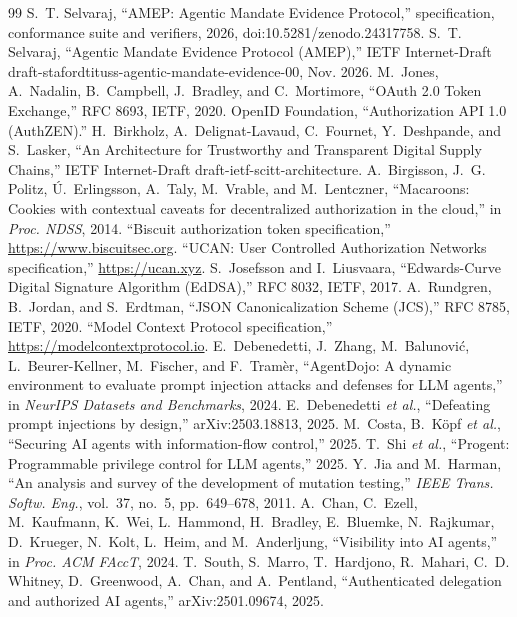 \documentclass[conference]{IEEEtran}
\begin{document}
\begin{thebibliography}{99}\small
{} S.~T. Selvaraj, ``AMEP: Agentic Mandate Evidence Protocol,'' specification, conformance suite and verifiers, 2026, doi:10.5281/zenodo.24317758.
 S.~T. Selvaraj, ``Agentic Mandate Evidence Protocol (AMEP),'' IETF Internet-Draft draft-stafordtituss-agentic-mandate-evidence-00, Nov. 2026.
 M.~Jones, A.~Nadalin, B.~Campbell, J.~Bradley, and C.~Mortimore, ``OAuth 2.0 Token Exchange,'' RFC 8693, IETF, 2020.
 OpenID Foundation, ``Authorization API 1.0 (AuthZEN).''
 H.~Birkholz, A.~Delignat-Lavaud, C.~Fournet, Y.~Deshpande, and S.~Lasker, ``An Architecture for Trustworthy and Transparent Digital Supply Chains,'' IETF Internet-Draft draft-ietf-scitt-architecture.
 A.~Birgisson, J.~G. Politz, {\'U}.~Erlingsson, A.~Taly, M.~Vrable, and M.~Lentczner, ``Macaroons: Cookies with contextual caveats for decentralized authorization in the cloud,'' in \emph{Proc. NDSS}, 2014.
 ``Biscuit authorization token specification,'' \url{https://www.biscuitsec.org}.
 ``UCAN: User Controlled Authorization Networks specification,'' \url{https://ucan.xyz}.
 S.~Josefsson and I.~Liusvaara, ``Edwards-Curve Digital Signature Algorithm (EdDSA),'' RFC 8032, IETF, 2017.
 A.~Rundgren, B.~Jordan, and S.~Erdtman, ``JSON Canonicalization Scheme (JCS),'' RFC 8785, IETF, 2020.
 ``Model Context Protocol specification,'' \url{https://modelcontextprotocol.io}.
 E.~Debenedetti, J.~Zhang, M.~Balunovi{\'c}, L.~Beurer-Kellner, M.~Fischer, and F.~Tram{\`e}r, ``AgentDojo: A dynamic environment to evaluate prompt injection attacks and defenses for LLM agents,'' in \emph{NeurIPS Datasets and Benchmarks}, 2024.
 E.~Debenedetti \emph{et al.}, ``Defeating prompt injections by design,'' arXiv:2503.18813, 2025.
 M.~Costa, B.~K{\"o}pf \emph{et al.}, ``Securing AI agents with information-flow control,'' 2025.
 T.~Shi \emph{et al.}, ``Progent: Programmable privilege control for LLM agents,'' 2025.
 Y.~Jia and M.~Harman, ``An analysis and survey of the development of mutation testing,'' \emph{IEEE Trans. Softw. Eng.}, vol.~37, no.~5, pp.~649--678, 2011.
 A.~Chan, C.~Ezell, M.~Kaufmann, K.~Wei, L.~Hammond, H.~Bradley, E.~Bluemke, N.~Rajkumar, D.~Krueger, N.~Kolt, L.~Heim, and M.~Anderljung, ``Visibility into AI agents,'' in \emph{Proc. ACM FAccT}, 2024.
 T.~South, S.~Marro, T.~Hardjono, R.~Mahari, C.~D. Whitney, D.~Greenwood, A.~Chan, and A.~Pentland, ``Authenticated delegation and authorized AI agents,'' arXiv:2501.09674, 2025.

\end{thebibliography}
\end{document}
